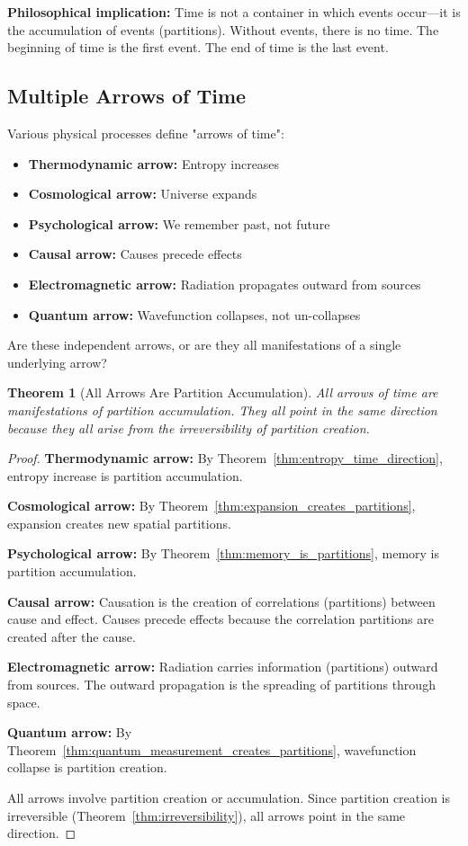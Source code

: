 \documentclass[twocolumn,10pt]{article}
\newtheorem{theorem}{Theorem}[section]
\theoremstyle{definition}
\theoremstyle{remark}
\begin{document}
\noindent\textbf{Philosophical implication:} Time is not a container in which events occur—it is the accumulation of events (partitions). Without events, there is no time. The beginning of time is the first event. The end of time is the last event.

\subsection{Multiple Arrows of Time}

Various physical processes define "arrows of time":
\begin{itemize}
\item \textbf{Thermodynamic arrow:} Entropy increases
\item \textbf{Cosmological arrow:} Universe expands
\item \textbf{Psychological arrow:} We remember past, not future
\item \textbf{Causal arrow:} Causes precede effects
\item \textbf{Electromagnetic arrow:} Radiation propagates outward from sources
\item \textbf{Quantum arrow:} Wavefunction collapses, not un-collapses
\end{itemize}

\noindent Are these independent arrows, or are they all manifestations of a single underlying arrow?

\begin{theorem}[All Arrows Are Partition Accumulation]
\label{thm:unified_arrow}
All arrows of time are manifestations of partition accumulation. They all point in the same direction because they all arise from the irreversibility of partition creation.
\end{theorem}

\begin{proof}
\textbf{Thermodynamic arrow:} By Theorem~\ref{thm:entropy_time_direction}, entropy increase is partition accumulation.

\textbf{Cosmological arrow:} By Theorem~\ref{thm:expansion_creates_partitions}, expansion creates new spatial partitions.

\textbf{Psychological arrow:} By Theorem~\ref{thm:memory_is_partitions}, memory is partition accumulation.

\textbf{Causal arrow:} Causation is the creation of correlations (partitions) between cause and effect. Causes precede effects because the correlation partitions are created after the cause.

\textbf{Electromagnetic arrow:} Radiation carries information (partitions) outward from sources. The outward propagation is the spreading of partitions through space.

\textbf{Quantum arrow:} By Theorem~\ref{thm:quantum_measurement_creates_partitions}, wavefunction collapse is partition creation.

All arrows involve partition creation or accumulation. Since partition creation is irreversible (Theorem~\ref{thm:irreversibility}), all arrows point in the same direction.
\end{proof}
\end{document}
